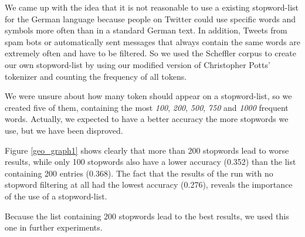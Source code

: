 \documentclass[../Main.tex]{subfiles}
\begin{document}
We came up with the idea that it is not reasonable to use a existing stopword-list for the German language because people on Twitter could use specific words and symbols more often than in a standard German text. In addition, Tweets from spam bots or automatically sent messages that always contain the same words are extremely often and have to be filtered. So we used the Scheffler corpus to create our own stopword-list by using our modified version of Christopher Potts' tokenizer and counting the frequency of all tokens.

We were unsure about how many token should appear on a stopword-list, so we created five of them, containing the most \emph{100}, \emph{200}, \emph{500}, \emph{750} and \emph{1000} frequent words. Actually, we expected to have a better accuracy the more stopwords we use, but we have been disproved.

Figure \ref{geo_graph1} shows clearly that more than 200 stopwords lead to worse results, while only 100 stopwords also have a lower accuracy (0.352) than the list containing 200 entries (0.368). The fact that the results of the run with no stopword filtering at all had the lowest accuracy (0.276), reveals the importance of the use of a stopword-list.

Because the list containing 200 stopwords lead to the best results, we used this one in further experiments.
\end{document}
